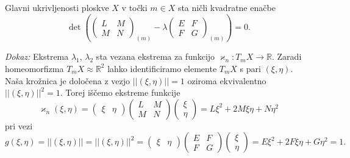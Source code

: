 \begin{izrek}
\label{izr_glavni_ukrivljenosti_sta_nicli_kvadratne_emacbe}
  Glavni ukrivljenosti ploskve $X$ v točki $m \in X$ sta ničli kvadratne enačbe 
  \begin{equation*} \det \left( \begin{pmatrix}
  L & M \\
  M & N
  \end{pmatrix}_{(m)} - \lambda \begin{pmatrix}
  E & F \\
  F & G
  \end{pmatrix}_{(m)}  \right) = 0. \end{equation*}
\end{izrek}
\noindent
{\em Dokaz:\/}
 Ekstrema $\lambda_1$, $\lambda_2$ sta vezana ekstrema za funkcijo $\varkappa_n: T_mX \to \mathbb{R}$.
 Zaradi homeomorfizma $T_mX \approx \mathbb{R}^2$ lahko identificiramo elemente $T_mX$ s pari $(\xi, \eta)$. Naša krožnica je
 določena z vezjo $\lvert\lvert (\xi, \eta) \rvert\rvert = 1$ oziroma ekvivalentno $\lvert\lvert (\xi, \eta) \rvert\rvert^2 = 1$. Torej iščemo ekstreme funkcije \begin{equation*}
   \varkappa_n(\xi, \eta) = \begin{pmatrix}
     \xi & \eta 
   \end{pmatrix}
   \begin{pmatrix}
     L & M \\
     M & N
   \end{pmatrix}  
   \begin{pmatrix}
     \xi \\
     \eta 
   \end{pmatrix} = L \xi^2 + 2M \xi \eta + N \eta^2
 \end{equation*}  
   pri vezi \begin{equation*}
     g(\xi, \eta)  = \lvert\lvert (\xi, \eta) \rvert\rvert =  \lvert\lvert (\xi, \eta) \rvert\rvert^2 = \begin{pmatrix}
       \xi & \eta 
     \end{pmatrix}
     \begin{pmatrix}
       E & F \\
       F & G
     \end{pmatrix}  
     \begin{pmatrix}
       \xi \\
       \eta 
     \end{pmatrix} = E \xi^2 + 2F \xi \eta + G \eta^2 = 1.
   \end{equation*}  

